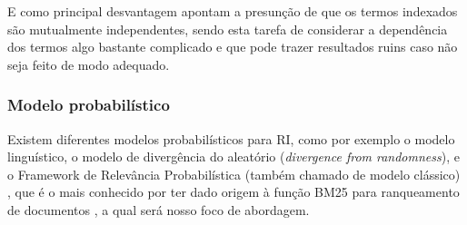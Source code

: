     E como principal desvantagem apontam a presunção de que os termos indexados são mutualmente independentes, sendo esta tarefa de considerar a dependência dos termos algo bastante complicado e que pode trazer resultados ruins caso não seja feito de modo adequado.

\subsubsection{Modelo probabilístico}  \label{subsubsec:Modelo-probabilístico}
    Existem diferentes modelos probabilísticos para RI, como por exemplo o modelo linguístico, o modelo de divergência do aleatório (\textit{divergence from randomness}), e o Framework de Relevância Probabilística (também chamado de modelo clássico) \cite[p.~87]{Zhai2016TDMA}, que é o mais conhecido por ter dado origem à função BM25 para ranqueamento de documentos \cite[p.~334--335]{robertson_probabilistic_2010} \cite[p.~111]{Zhai2016TDMA}, a qual será nosso foco de abordagem.
    
    
